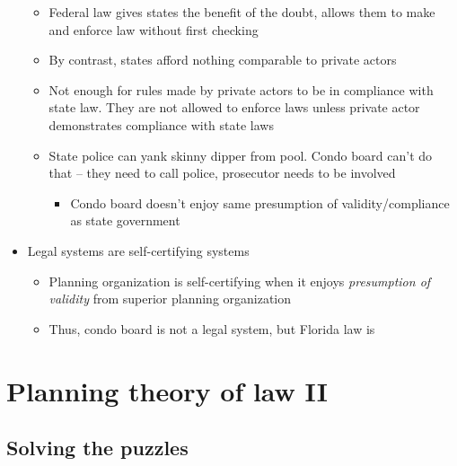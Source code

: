 \begin{itemize}
  \begin{itemize}
  \tightlist
  \item
    Federal law gives states the benefit of the doubt, allows them to
    make and enforce law without first checking
  \item
    By contrast, states afford nothing comparable to private actors
  \item
    Not enough for rules made by private actors to be in compliance with
    state law. They are not allowed to enforce laws unless private actor
    demonstrates compliance with state laws
  \item
    State police can yank skinny dipper from pool. Condo board can't do
    that -- they need to call police, prosecutor needs to be involved

    \begin{itemize}
    \tightlist
    \item
      Condo board doesn't enjoy same presumption of validity/compliance
      as state government
    \end{itemize}
  \end{itemize}
\item
  Legal systems are self-certifying systems

  \begin{itemize}
  \tightlist
  \item
    Planning organization is self-certifying when it enjoys
    \emph{presumption of validity} from superior planning organization
  \item
    Thus, condo board is not a legal system, but Florida law is
  \end{itemize}
\end{itemize}

\hypertarget{planning-theory-of-law-ii}{%
\section{Planning theory of law II}\label{planning-theory-of-law-ii}}

\hypertarget{solving-the-puzzles}{%
\subsection{Solving the puzzles}\label{solving-the-puzzles}}

